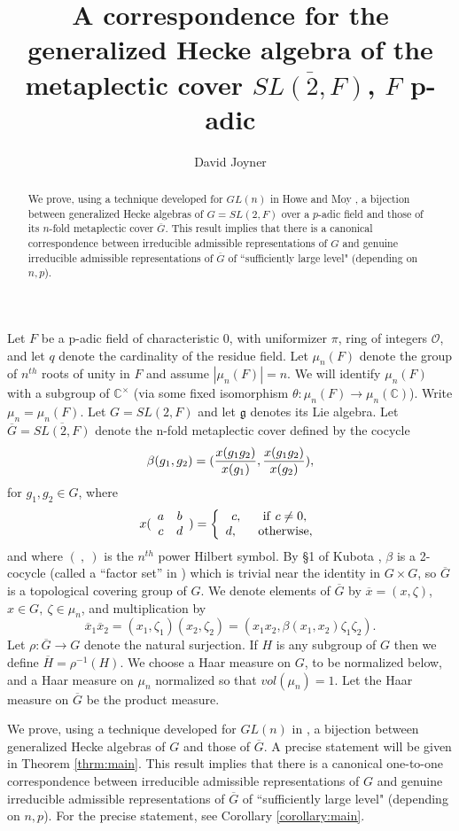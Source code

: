 \documentclass[12pt,letterpaper]{amsart}
\title[The generalized Hecke algebra of
$\overline{SL(2,F)}$]{A correspondence for the generalized Hecke algebra of
the metaplectic cover $\overline{SL(2,F)}$, $F$ p-adic}
\author{David Joyner}
\newcommand{\abstracttext}{We prove, using a technique developed for 
$GL(n)$ in Howe and Moy \cite{H}, 
a bijection between generalized Hecke
algebras of $G=SL(2,F)$ over a $p$-adic field
and those of its $n$-fold metaplectic cover $\overline{G}$. 
This result implies that
there is a canonical correspondence
between irreducible admissible representations of $G$ and 
genuine irreducible admissible representations of $\overline{G}$
of ``sufficiently large level" (depending on $n,p$).}
\theoremstyle{definition}
\theoremstyle{remark}
\begin{document}
\begin{abstract}
\abstracttext
\end{abstract}
\maketitle


Let $F$ be a p-adic field of characteristic 0, 
with uniformizer $\pi$, ring of integers $\mathcal{O}$, and let 
$q$ denote the cardinality of the residue field.
Let $\mu_n(F)$ denote the group of $n^{th}$ roots of unity
in $F$ and assume $|\mu_n(F)|=n$. We 
will identify $\mu_n(F)$ with a subgroup 
of ${\mathbb{C}}^\times$
(via some fixed isomorphism 
$\theta:\mu_n(F)\rightarrow \mu_n({\mathbb{C}})$).
Write $\mu_n=\mu_n(F)$.
Let $G=SL(2,F)$ and let $\mathfrak{g}$ denotes its Lie algebra.
Let $\overline{G}=\overline{SL(2,F)}$ denote the n-fold metaplectic
cover defined by the cocycle
\[
\beta(g_1,g_2)=({x(g_1g_2)\over x(g_1)},{x(g_1g_2)\over x(g_2)}),
\]
for $g_1,g_2\in G$, where
\[
x(
\begin{array}{cc}
a & b\\
c & d
\end{array}
)=
\left\{
\begin{array}{c}
c,\ \ \ \ \ {\rm if}\ c\not= 0,\\
d,\ \ \ \ \ {\rm otherwise},
\end{array}
\right.
\]
and where $(\ ,\ )$ is the $n^{th}$ power Hilbert symbol. 
By \S 1 of Kubota \cite{K}, $\beta$ is a 2-cocycle 
(called a ``factor set'' in \cite{K}) which is trivial
near the identity in $G\times G$, so $\overline{G}$ is a 
topological covering group of $G$. We denote
elements of $\overline{G}$ by $\overline{x}=(x,\zeta)$,
$x\in G,\ \zeta\in \mu_n$, and multiplication by
\[
\overline{x}_1\overline{x}_2=(x_1,\zeta_1)(x_2,\zeta_2)
=(x_1x_2,\beta(x_1,x_2)\zeta_1\zeta_2).
\]
Let $\rho:\overline{G}\rightarrow G$ denote
the natural surjection. If $H$ is any subgroup
of $G$ then we define $\overline{H}=\rho^{-1}(H)$.
We choose a Haar measure on $G$, to be normalized
below, and a Haar measure on $\mu_n$ normalized so that 
$vol(\mu_n)=1$. Let the Haar measure on $\overline{G}$ be
the product measure.

We prove, using a technique developed for $GL(n)$ in \cite{H}, 
a bijection between generalized Hecke
algebras of $G$ and those of $\overline{G}$. 
A precise statement will be
given in Theorem \ref{thrm:main}. This result implies that
there is a canonical one-to-one correspondence
between irreducible admissible representations of $G$ and 
genuine irreducible admissible representations of $\overline{G}$
of ``sufficiently large level" (depending on $n,p$).
For the precise statement, see Corollary
\ref{corollary:main}. 
\end{document}
